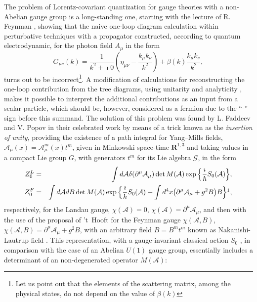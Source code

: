 \documentclass[10pt]{article}
\begin{document}
The problem of Lorentz-covariant quantization for gauge theories
with a non-Abelian gauge group \cite{YangMills} is a long-standing
one, starting with the lecture of R. Feynman   \cite{Feynman}, showing that the naive one-loop
diagram calculation within perturbative techniques with a propagator
constructed, according to quantum electrodynamic, for the photon field $A_\mu$
in the form
  \begin{equation}\label{qedprop}
    G_{\mu\nu}(k)=\frac{1}{k^2+ \imath 0}\left(\eta_{\mu\nu}- \frac{k_\mu k_\nu}{k^2}\right)+ \beta(k)\frac{k_\mu k_\nu}{k^2},
  \end{equation}
turns out to be incorrect\footnote{Let us point out that the elements
of the scattering matrix, among the physical states, do not depend on
the value of $\beta(k)$}.
A modification of calculations for reconstructing the one-loop contribution from
the tree diagrams, using unitarity and analyticity \cite{Feynman}, makes it possible
to interpret the additional contributions as an input from a scalar particle,
which should be, however, considered as a fermion due to the ``-'' sign before this
summand. The solution of this problem was found by L. Faddeev and V. Popov
in their celebrated work \cite{fp} by means of a trick known as the
\emph{insertion of unity}, providing the existence of a path integral for Yang--Mills fields,
$\mathcal{A}_\mu (x)= \mathcal{A}_\mu^m(x)t^m$, given in Minkowski space-time
$\mathbf{R}^{1,3}$ and taking values in a compact Lie group $G$,
with generators $t^m$ for its Lie algebra $\mathcal{G}$, in the form
\begin{eqnarray}\label{PintfpL}
  Z^L_{0} & = & \int  d \mathcal{A} \delta(\partial^\mu \mathcal{A}_\mu)\det M(\mathcal{A}) \exp\Big\{\frac{\imath}{\hbar}S_0(\mathcal{A})\Big\},   \\
  \label{PintfpF} Z^F_{0} & = &  \int  d \mathcal{A} d B \det M(\mathcal{A}) \exp\Big\{\frac{\imath}{\hbar}S_0(\mathcal{A})+ \int d^4x  \big(\partial^\mu \mathcal{A}_\mu + {g^2}B\big)B\Big\}\footnotemark,
\end{eqnarray}respectively, for the Landau gauge, $\chi( \mathcal{A})=0$, $\chi( \mathcal{A})=\partial^\mu \mathcal{A}_\mu$,  and then with the use of the proposal of 't~Hooft \cite{t'Hooft} for the Feynman gauge $\chi( \mathcal{A},B)$, $\chi( \mathcal{A},B)=\partial^\mu \mathcal{A}_\mu +{g^2} B$,  with an arbitrary field $B=B^mt^m$ known as Nakanishi-Lautrup field \cite{Nakanishi, Lautrup}. This representation, with a gauge-invariant classical action $S_0$ , in comparison with the case of an Abelian $U(1)$ gauge group, essentially includes a determinant of an non-degenerated operator $M(\mathcal{A}) $:
\end{document}
